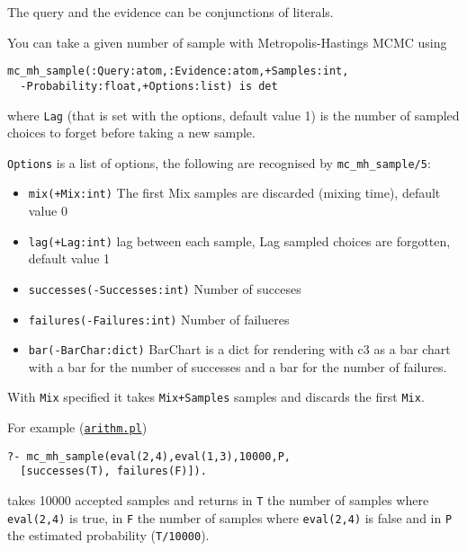 The query and the evidence can be conjunctions of literals.

You can take a given number of sample with Metropolis-Hastings MCMC using
\begin{verbatim}
mc_mh_sample(:Query:atom,:Evidence:atom,+Samples:int,
  -Probability:float,+Options:list) is det
\end{verbatim}
where \verb|Lag| (that is set with the options, default value 1) is the number of sampled choices to forget before taking a new sample.

\verb|Options| is a list of options, the following are recognised by \verb|mc_mh_sample/5|:
\begin{itemize}
\item \verb|mix(+Mix:int)|
The first Mix samples are discarded (mixing time), default value 0
\item \verb|lag(+Lag:int)|
lag between each sample, Lag sampled choices are forgotten, default value 1
\item \verb|successes(-Successes:int)|
Number of succeses
\item \verb|failures(-Failures:int)|
Number of failueres
\item \verb|bar(-BarChar:dict)|
BarChart is a dict for rendering with c3 as a bar chart with
a bar for the number of successes and a bar for the number
of failures.
\end{itemize}
With \verb|Mix| specified it takes \verb|Mix+Samples| samples and discards the first \verb|Mix|.

For example (\href{http://cplint.eu/example/inference/arithm.pl}{\texttt{arithm.pl}})
\begin{verbatim}
?- mc_mh_sample(eval(2,4),eval(1,3),10000,P,
  [successes(T), failures(F)]).
\end{verbatim}
takes 10000 accepted samples and returns in \verb|T| the number of samples where
\verb|eval(2,4)| is true, in \verb|F| the number of samples where \verb|eval(2,4)| is false and in \verb|P| the
estimated probability (\verb|T/10000|).

